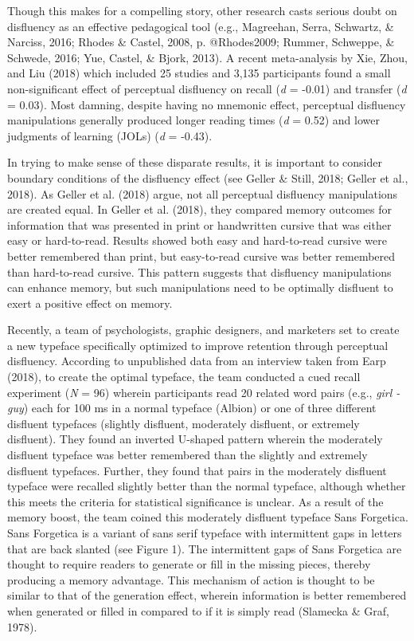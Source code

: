 \documentclass[
  english,
  jou]{apa6}
\begin{document}
Though this makes for a compelling story, other research casts serious doubt on disfluency as an effective pedagogical tool (e.g., Magreehan, Serra, Schwartz, \& Narciss, 2016; Rhodes \& Castel, 2008, p. @Rhodes2009; Rummer, Schweppe, \& Schwede, 2016; Yue, Castel, \& Bjork, 2013). A recent meta-analysis by Xie, Zhou, and Liu (2018) which included 25 studies and 3,135 participants found a small non-significant effect of perceptual disfluency on recall (\emph{d} = -0.01) and transfer (\emph{d} = 0.03). Most damning, despite having no mnemonic effect, perceptual disfluency manipulations generally produced longer reading times (\emph{d} = 0.52) and lower judgments of learning (JOLs) (\emph{d} = -0.43).

In trying to make sense of these disparate results, it is important to consider boundary conditions of the disfluency effect (see Geller \& Still, 2018; Geller et al., 2018). As Geller et al. (2018) argue, not all perceptual disfluency manipulations are created equal. In Geller et al. (2018), they compared memory outcomes for information that was presented in print or handwritten cursive that was either easy or hard-to-read. Results showed both easy and hard-to-read cursive were better remembered than print, but easy-to-read cursive was better remembered than hard-to-read cursive. This pattern suggests that disfluency manipulations can enhance memory, but such manipulations need to be optimally disfluent to exert a positive effect on memory.

Recently, a team of psychologists, graphic designers, and marketers set to create a new typeface specifically optimized to improve retention through perceptual disfluency. According to unpublished data from an interview taken from Earp (2018), to create the optimal typeface, the team conducted a cued recall experiment (\emph{N} = 96) wherein participants read 20 related word pairs (e.g., \emph{girl - guy}) each for 100 ms in a normal typeface (Albion) or one of three different disfluent typefaces (slightly disfluent, moderately disfluent, or extremely disfluent). They found an inverted U-shaped pattern wherein the moderately disfluent typeface was better remembered than the slightly and extremely disfluent typefaces. Further, they found that pairs in the moderately disfluent typeface were recalled slightly better than the normal typeface, although whether this meets the criteria for statistical significance is unclear. As a result of the memory boost, the team coined this moderately disfluent typeface Sans Forgetica. Sans Forgetica is a variant of sans serif typeface with intermittent gaps in letters that are back slanted (see Figure 1). The intermittent gaps of Sans Forgetica are thought to require readers to generate or fill in the missing pieces, thereby producing a memory advantage. This mechanism of action is thought to be similar to that of the generation effect, wherein information is better remembered when generated or filled in compared to if it is simply read (Slamecka \& Graf, 1978).
\end{document}

